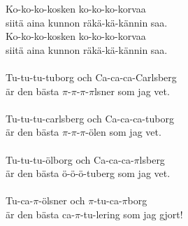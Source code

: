 
Ko-ko-ko-kosken ko-ko-ko-korvaa \\ siitä aina kunnon räkä-kä-kännin saa. \\ Ko-ko-ko-kosken ko-ko-ko-korvaa \\ siitä aina kunnon räkä-kä-kännin saa. \\ \hspace{10mm} \\ Tu-tu-tu-tuborg och Ca-ca-ca-Carlsberg \\ är den bästa $\pi$-$\pi$-$\pi$-$\pi$lsner som jag vet. \\ \hspace{10mm} \\ Tu-tu-tu-carlsberg och Ca-ca-ca-tuborg \\ är den bästa $\pi$-$\pi$-$\pi$-ölen som jag vet. \\ \hspace{10mm} \\ Tu-tu-tu-ölborg och Ca-ca-ca-$\pi$lsberg \\ är den bästa ö-ö-ö-tuberg som jag vet. \\ \hspace{10mm} \\ Tu-ca-$\pi$-ölsner och $\pi$-tu-ca-$\pi$borg \\ är den bästa ca-$\pi$-tu-lering som jag gjort!